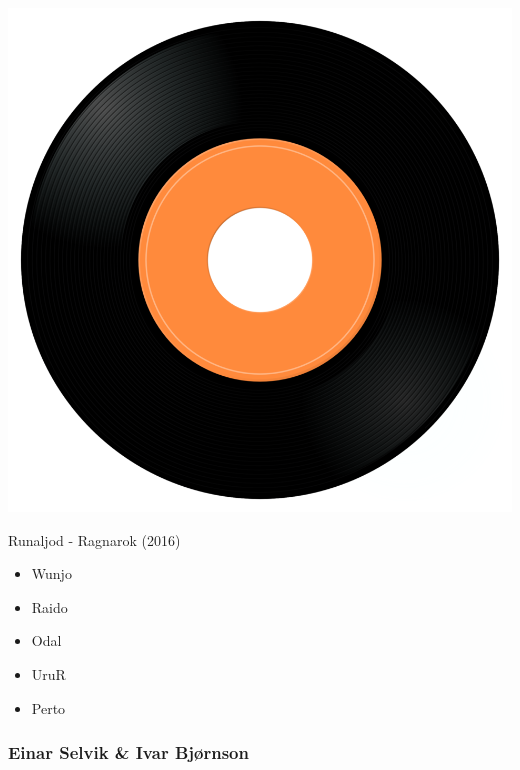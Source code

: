 \begin{minipage}[t]{0.25\textwidth}
\captionsetup{type=figure}
\includegraphics[width=\textwidth]{Images/cover.png}
\caption*{Runaljod - Ragnarok (2016)}
\end{minipage}
\begin{minipage}[t]{0.25\textwidth}\vspace{0pt}
\begin{itemize}[nosep,leftmargin=1em,labelwidth=*,align=left]
	\setlength{\itemsep}{0pt}
	\item Wunjo
	\item Raido
	\item Odal 
	\item UruR
	\item Perto
\end{itemize}
\end{minipage}

\subsubsection{Einar Selvik \& Ivar Bjørnson}

